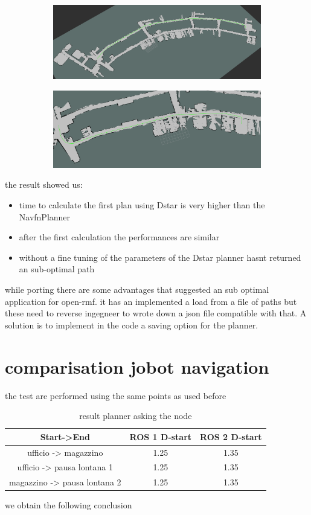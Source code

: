 \begin{figure}[h]
	\begin{subfigure}{.5\textwidth}
		\centering
		\includegraphics[width=.8\linewidth]{img/Navfn_plan_disegnatori_ingresso.png}
	\end{subfigure}%
	\begin{subfigure}{.5\textwidth}
		\centering
		\includegraphics[width=.8\linewidth]{img/Navfn_plan_ufficio_ingresso.png}
	\end{subfigure}
\end{figure}

the result showed us:
\begin{itemize}
	\item time to calculate the first plan using Dstar is very higher than the NavfnPlanner
	\item after the first calculation the performances are similar
	\item without a fine tuning of the parameters of the Dstar planner hasnt returned an sub-optimal path
\end{itemize}

while porting there are some advantages that suggested an sub optimal application for open-rmf. it has an implemented a load from a file of paths but these need to reverse ingegneer to wrote down a json file compatible with that. A solution is to implement in the code a saving option for the planner.
 

\section{comparisation jobot navigation}
the test are performed using the same points as used before
\begin{table}[h]
	\centering
	\begin{tabular}{|c|c|c|}
		\hline
		Start->End & ROS 1 D-start & ROS 2 D-start \\
		\hline
		ufficio -> magazzino & 1.25 & 1.35\\
		\hline
		ufficio -> pausa lontana 1 & 1.25 & 1.35\\
		\hline
		magazzino -> pausa lontana 2 & 1.25 & 1.35\\
		\hline
	\end{tabular}
	\caption{result planner asking the node}
\end{table}
we obtain the following conclusion

